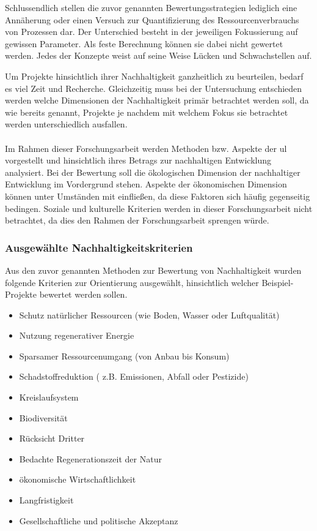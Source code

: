 \documentclass{scrartcl}
\begin{document}
Schlussendlich stellen die zuvor genannten Bewertungsstrategien lediglich eine Annäherung oder einen Versuch zur Quantifizierung des Ressourcenverbrauchs von Prozessen dar. Der Unterschied besteht in der jeweiligen Fokussierung auf gewissen Parameter.  Als feste Berechnung können sie dabei nicht gewertet werden. Jedes der Konzepte weist auf seine Weise Lücken und Schwachstellen auf. 




Um Projekte hinsichtlich ihrer Nachhaltigkeit ganzheitlich zu beurteilen, bedarf es viel Zeit und Recherche. Gleichzeitig muss bei der Untersuchung entschieden werden welche Dimensionen der Nachhaltigkeit primär betrachtet werden soll, da wie bereits genannt, Projekte je nachdem mit welchem Fokus sie betrachtet werden unterschiedlich ausfallen.\\
\\
Im Rahmen dieser Forschungsarbeit werden Methoden bzw. Aspekte der \acs{ul} vorgestellt und hinsichtlich ihres Betrags zur nachhaltigen Entwicklung analysiert. Bei der Bewertung soll die ökologischen Dimension der nachhaltiger Entwicklung im Vordergrund stehen. Aspekte der ökonomischen Dimension können unter Umständen mit einfließen, da diese Faktoren sich häufig gegenseitig bedingen. Soziale und kulturelle Kriterien werden in dieser Forschungsarbeit nicht betrachtet, da dies den Rahmen der Forschungsarbeit sprengen würde.

\subsubsection{Ausgewählte Nachhaltigkeitskriterien} \label{nachhaltigkeitskriterien}

Aus den zuvor genannten Methoden zur Bewertung von Nachhaltigkeit wurden folgende Kriterien zur Orientierung ausgewählt, hinsichtlich welcher Beispiel-Projekte bewertet werden sollen.

\begin{itemize}
\item  Schutz natürlicher Ressourcen (wie Boden, Wasser oder Luftqualität)
\item Nutzung regenerativer Energie
\item Sparsamer Ressourcenumgang (von Anbau bis Konsum)
\item Schadstoffreduktion ( z.B. Emissionen, Abfall oder Pestizide)
\item Kreislaufsystem
\item Biodiversität
\item Rücksicht Dritter
\item Bedachte Regenerationszeit der Natur
\item ökonomische Wirtschaftlichkeit
\item Langfristigkeit
\item Gesellschaftliche und politische Akzeptanz
\end{itemize}
\end{document}
